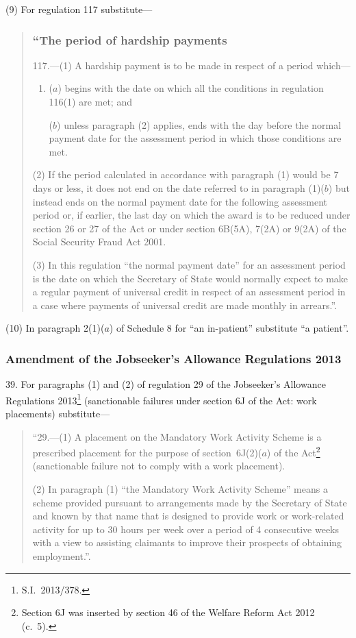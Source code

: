 \documentclass[12pt,a4paper]{article}
\begin{document}
(9) For regulation 117 substitute—
\begin{quotation}
\subsubsection*{“The period of hardship payments}

117.—(1) A hardship payment is to be made in respect of a period which—
\begin{enumerate}\item[]
($a$) begins with the date on which all the conditions in regulation 116(1) are met; and

($b$) unless paragraph (2) applies, ends with the day before the normal payment date for the assessment period in which those conditions are met.
\end{enumerate}

(2) If the period calculated in accordance with paragraph (1) would be 7 days or less, it does not end on the date referred to in paragraph (1)($b$)  but instead ends on the normal payment date for the following assessment period or, if earlier, the last day on which the award is to be reduced under section 26 or 27 of the Act or under section 6B(5A), 7(2A) or 9(2A) of the Social Security Fraud Act 2001.

(3) In this regulation “the normal payment date” for an assessment period is the date on which the Secretary of State would normally expect to make a regular payment of universal credit in respect of an assessment period in a case where payments of universal credit are made monthly in arrears.”.
\end{quotation}

(10) In paragraph 2(1)($a$)  of Schedule 8 for “an in-patient” substitute “a patient”.

\subsubsection[39. Amendment of the Jobseeker’s Allowance Regulations 2013]{Amendment of the Jobseeker’s Allowance Regulations 2013}

39.  For paragraphs (1) and (2) of regulation 29 of the Jobseeker’s Allowance Regulations 2013\footnote{S.I.~2013/378.} (sanctionable failures under section 6J of the Act: work placements) substitute---
\begin{quotation}
\begin{sloppypar}
“29.—(1) A placement on the Mandatory Work Activity Scheme is a prescribed placement for the purpose of section~6J(2)($a$)  of the Act\footnote{Section 6J was inserted by section 46 of the Welfare Reform Act 2012 (c.~5).} (sanctionable failure not to comply with a work placement).
\end{sloppypar}

(2) In paragraph (1) “the Mandatory Work Activity Scheme” means a scheme provided pursuant to arrangements made by the Secretary of State and known by that name that is designed to provide work or work-related activity for up to 30 hours per week over a period of 4 consecutive weeks with a view to assisting claimants to improve their prospects of obtaining employment.”.
\end{quotation}
\end{document}

